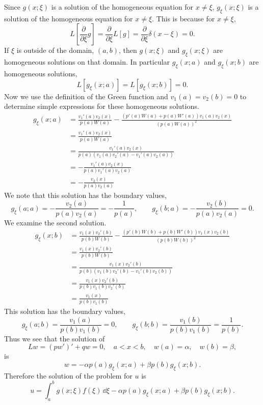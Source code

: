 {\begin{Solution}
  Since $g(x;\xi)$ is a solution of the homogeneous equation for $x \neq \xi$,
  $g_\xi(x;\xi)$ is a solution of the homogeneous equation for $x \neq \xi$.
  This is because for $x \neq \xi$, 
  \[
  L \left[ \frac{\partial}{\partial \xi} g \right] = \frac{\partial}{\partial \xi} L[g]
  = \frac{\partial}{\partial \xi} \delta(x-\xi) = 0.
  \]
  If $\xi$ is outside of the domain, $(a,b)$, then $g(x;\xi)$ and
  $g_\xi(x;\xi)$ are homogeneous solutions on that domain.  In particular
  $g_\xi(x;a)$ and $g_\xi(x;b)$ are homogeneous solutions,
  \[
  L \left[ g_\xi(x;a) \right] = L \left[ g_\xi(x;b) \right] = 0.
  \]
  Now we use the definition of the Green function and $v_1(a) = v_2(b) = 0$
  to determine simple expressions for these homogeneous solutions.
  \begin{align*}
    g_\xi(x;a) &= \frac{ v_1'(a) v_2(x) }{ p(a) W(a) }
    - \frac{ (p'(a) W(a) + p(a) W'(a)) v_1(a) v_2(x) }{ (p(a) W(a))^2 } \\
    &= \frac{ v_1'(a) v_2(x) }{ p(a) W(a) } \\
    &= \frac{ v_1'(a) v_2(x) }{ p(a) (v_1(a) v_2'(a) - v_1'(a) v_2(a)) } \\
    &= - \frac{ v_1'(a) v_2(x) }{ p(a) v_1'(a) v_2(a) } \\
    &= - \frac{ v_2(x) }{ p(a) v_2(a) } 
  \end{align*}
  We note that this solution has the boundary values,
  \[
  g_\xi(a;a) = - \frac{ v_2(a) }{ p(a) v_2(a) } = - \frac{1}{p(a)}, \qquad
  g_\xi(b;a) = - \frac{ v_2(b) }{ p(a) v_2(a) } = 0.
  \]
  We examine the second solution.
  \begin{align*}
    g_\xi(x;b) &= \frac{ v_1(x) v_2'(b) }{ p(b) W(b) }
    - \frac{ (p'(b) W(b) + p(b) W'(b)) v_1(x) v_2(b) }{ (p(b) W(b))^2 } \\
    &= \frac{ v_1(x) v_2'(b) }{ p(b) W(b) } \\
    &= \frac{ v_1(x) v_2'(b) }{ p(b) (v_1(b) v_2'(b) - v_1'(b) v_2(b)) } \\
    &= \frac{ v_1(x) v_2'(b) }{ p(b) v_1(b) v_2'(b) } \\
    &= \frac{ v_1(x) }{ p(b) v_1(b) } 
  \end{align*}
  This solution has the boundary values,
  \[
  g_\xi(a;b) = \frac{ v_1(a) }{ p(b) v_1(b) } = 0, \qquad
  g_\xi(b;b) = \frac{ v_1(b) }{ p(b) v_1(b) } = \frac{1}{p(b)}.
  \]
  Thus we see that the solution of 
  \[
  L w = (p w')' + q w = 0, \quad a < x < b, 
  \quad w(a) = \alpha, \quad w(b) = \beta,
  \]
  is
  \[
  w = - \alpha p(a) g_\xi(x;a) + \beta p(b) g_\xi(x;b).
  \]
  Therefore the solution of the problem for $u$ is
  \[
  \boxed{
    u = \int_a^b g(x;\xi) f(\xi) \,\dd \xi 
    - \alpha p(a) g_\xi(x;a) + \beta p(b) g_\xi(x;b).
    }
  \]
\end{Solution}








}
